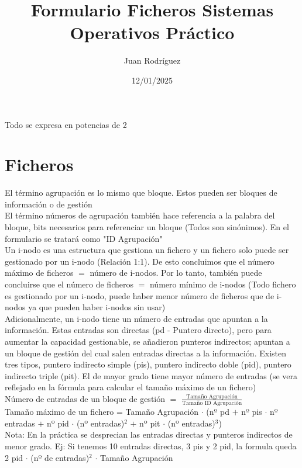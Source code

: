 \documentclass[fleqn]{article}
\author{Juan Rodríguez}
\title{Formulario Ficheros Sistemas Operativos Práctico}
\date{12/01/2025}
\begin{document}
	\maketitle
	Todo se expresa en potencias de 2
	\section{Ficheros}
	El término agrupación es lo mismo que bloque. Estos pueden ser bloques de información o de gestión \\
	
	El término números de agrupación también hace referencia a la palabra del bloque, bits necesarios para referenciar un bloque (Todos son sinónimos). En el formulario se tratará como "ID Agrupación" \\
	
	Un i-nodo es una estructura que gestiona un fichero y un fichero solo puede ser gestionado por un i-nodo (Relación 1:1). De esto concluimos que el número máximo de ficheros $=$ número de i-nodos. Por lo tanto, también puede concluirse que el número de ficheros $=$ número mínimo de i-nodos (Todo fichero es gestionado por un i-nodo, puede haber menor número de ficheros que de i-nodos ya que pueden haber i-nodos sin usar) \\
	
	Adicionalmente, un i-nodo tiene un número de entradas que apuntan a la información. Estas entradas son directas (pd - Puntero directo), pero para aumentar la capacidad gestionable, se añadieron punteros indirectos; apuntan a un bloque de gestión del cual salen entradas directas a la información. Existen tres tipos, puntero indirecto simple (pis), puntero indirecto doble (pid), puntero indirecto triple (pit). El de mayor grado tiene mayor número de entradas (se vera reflejado en la fórmula para calcular el tamaño máximo de un fichero) \\
	 
	Número de entradas de un bloque de gestión $=$ $\frac{\text{Tamaño Agrupación}}{\text{Tamaño ID Agrupación}}$ \\
	
	Tamaño máximo de un fichero = Tamaño Agrupación $\cdot$ (nº pd $+$ nº pis $\cdot$ nº entradas $+$ nº pid $\cdot$ (nº entradas)$^{2}$ $+$ nº pit $\cdot$ (nº entradas)$^{3}$) \\
	
	Nota: En la práctica se desprecian las entradas directas y punteros indirectos de menor grado. Ej: Si tenemos 10 entradas directas, 3 pis y 2 pid, la formula queda 2 pid $\cdot$ (nº de entradas)$^{2}$ $\cdot$ Tamaño Agrupación \\
	
\end{document}
